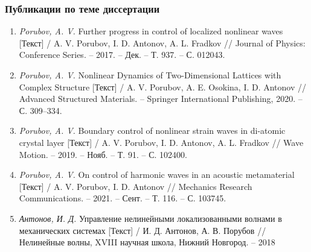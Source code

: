 \begin{frame} %
	\frametitle{Публикации по теме диссертации}
	\begin{small}
		\begin{enumerate}
			\item \textit{Porubov, A. V.} Further progress in control of localized nonlinear waves [Текст] / A. V. Porubov, I. D. Antonov, A. L. Fradkov // Journal of Physics: Conference Series. -- 2017. -- Дек. -- Т. 937. -- С. 012043.	
			
			\item \textit{Porubov, A. V.} Nonlinear Dynamics of Two-Dimensional Lattices with Complex Structure [Текст] / A. V. Porubov, A. E. Osokina, I. D. Antonov // Advanced Structured Materials. -- Springer International Publishing, 2020. -- С. 309--334.
			
			\item \textit{Porubov, A. V.} Boundary control of nonlinear strain waves in di-atomic crystal layer [Текст] / A. V. Porubov, I. D. Antonov, A. L. Fradkov // Wave Motion. -- 2019. -- Нояб. -- Т. 91. -- С. 102400.
			
			\item \textit{Porubov, A. V.} On control of harmonic waves in an acoustic metamaterial [Текст] / A. V. Porubov, I. D. Antonov // Mechanics Research Communications. -- 2021. -- Сент. -- Т. 116. -- С. 103745.
			
			\item \textit{Антонов, И. Д.} Управление нелинейными локализованными волнами в механических системах [Текст] / И. Д. Антонов, А. В. Порубов // Нелинейные волны, XVIII научная школа, Нижний Новгород. -- 2018
		\end{enumerate}
	\end{small}
\end{frame}


